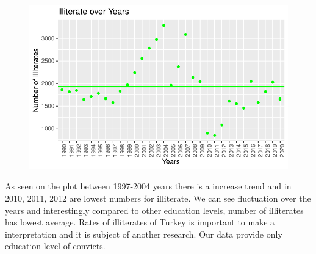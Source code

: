 \documentclass[
  11pt,
  a4paper,
  DIV=11,
  numbers=noendperiod]{scrartcl}
\newenvironment{Shaded}{\begin{snugshade}}{\end{snugshade}}
\newcommand{\AttributeTok}[1]{\textcolor[rgb]{0.40,0.45,0.13}{#1}}
\newcommand{\DecValTok}[1]{\textcolor[rgb]{0.68,0.00,0.00}{#1}}
\newcommand{\FunctionTok}[1]{\textcolor[rgb]{0.28,0.35,0.67}{#1}}
\newcommand{\NormalTok}[1]{\textcolor[rgb]{0.00,0.23,0.31}{#1}}
\newcommand{\OtherTok}[1]{\textcolor[rgb]{0.00,0.23,0.31}{#1}}
\newcommand{\SpecialCharTok}[1]{\textcolor[rgb]{0.37,0.37,0.37}{#1}}
\newcommand{\StringTok}[1]{\textcolor[rgb]{0.13,0.47,0.30}{#1}}
\begin{document}
\begin{Shaded}
\end{Shaded}

\begin{figure}[H]

{\centering \includegraphics{analysis_files/figure-pdf/unnamed-chunk-1-1.pdf}

}

\end{figure}

As seen on the plot between 1997-2004 years there is a increase trend
and in 2010, 2011, 2012 are lowest numbers for illiterate. We can see
fluctuation over the years and interestingly compared to other education
levels, number of illiterates has lowest average. Rates of illiterates
of Turkey is important to make a interpretation and it is subject of
another research. Our data provide only education level of convicts.
\end{document}
